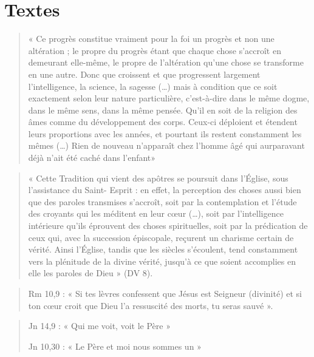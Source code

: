   



\section{Textes} 

\begin{quote}
    « Ce progrès constitue vraiment pour la foi un progrès et non une
altération ; le propre du progrès étant que chaque chose s'accroît en
demeurant elle-même, le propre de l'altération qu'une chose se
transforme en une autre. Donc que croissent et que progressent largement
l'intelligence, la science, la sagesse (\ldots) mais à condition que ce
soit exactement selon leur nature particulière, c'est-à-dire dans le
même dogme, dans le même sens, dans la même pensée. Qu'il en soit de la
religion des âmes comme du développement des corps. Ceux-ci déploient et
étendent leurs proportions avec les années, et pourtant ils restent
constamment les mêmes (\ldots) Rien de nouveau n'apparaît chez l'homme
âgé qui aurparavant déjà n'ait été caché dans l'enfant» 
\end{quote}

\begin{quote}
    « Cette Tradition qui vient des apôtres se poursuit dans l'Église, sous
l'assistance du Saint- Esprit : en effet, la perception des choses aussi
bien que des paroles transmises s'accroît, soit par la contemplation et
l'étude des croyants qui les méditent en leur cœur (\ldots), soit par
l'intelligence intérieure qu'ils éprouvent des choses spirituelles, soit
par la prédication de ceux qui, avec la succession épiscopale, reçurent
un charisme certain de vérité. Ainsi l'Église, tandis que les siècles
s'écoulent, tend constamment vers la plénitude de la divine vérité,
jusqu'à ce que soient accomplies en elle les paroles de Dieu » (DV 8).
\end{quote}

\begin{quote}
    Rm 10,9 : « Si tes lèvres confessent que Jésus est Seigneur (divinité)
et si ton cœur croit que Dieu l'a ressuscité des morts, tu seras sauvé
».
\end{quote}

\begin{quote}
    Jn 14,9 : « Qui me voit, voit le Père »

Jn 10,30 : « Le Père et moi nous sommes un »
\end{quote}

